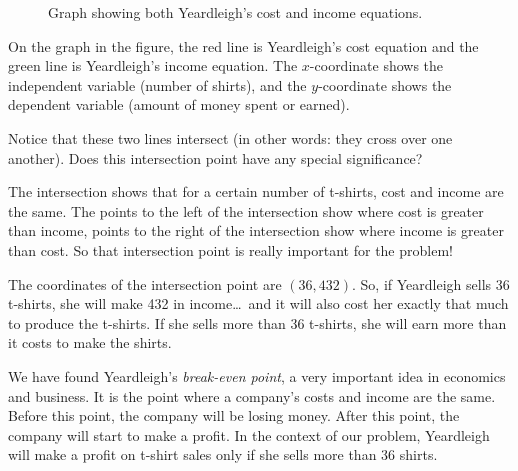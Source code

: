\begin{figure}[!htbp]
\centering
{}
\caption{Graph showing both Yeardleigh's cost and income equations.}
\label{fig:tshirts}
\end{figure}

On the graph in the figure, the red line is Yeardleigh's cost equation and the green line is Yeardleigh's income equation. The $x$-coordinate shows the independent variable (number of shirts), and the $y$-coordinate shows the dependent variable (amount of money spent or earned).

Notice that these two lines intersect (in other words: they cross over one another). Does this intersection point have any special significance?

The intersection shows that for a certain number of t-shirts, cost and income are the same. The points to the left of the intersection show where cost is greater than income, points to the right of the intersection show where income is greater than cost. So that intersection point is really important for the problem!

The coordinates of the intersection point are $(36, 432)$. So, if Yeardleigh sells 36 t-shirts, she will make 432 in income\ldots\ and it will also cost her exactly that much to produce the t-shirts. If she sells more than 36 t-shirts, she will earn more than it costs to make the shirts.

We have found Yeardleigh's \textit{break-even point}, a very important idea in economics and business. It is the point where a company's costs and income are the same. Before this point, the company will be losing money. After this point, the company will start to make a profit. In the context of our problem, Yeardleigh will make a profit on t-shirt sales only if she sells more than 36 shirts.

